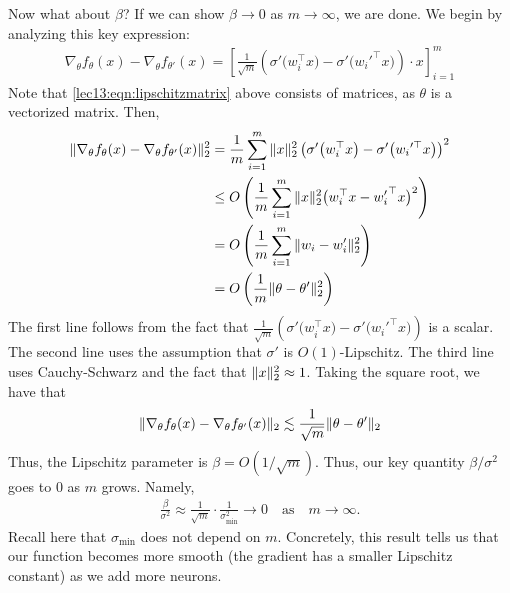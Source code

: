 \begin{enumerate}
    Now what about $\beta$? If we can show $\beta \to 0$ as $m \to \infty$, we are done. We begin by analyzing this key expression:  
    \begin{align}
        \nabla_\theta f_\theta(x) - \nabla_\theta f_{\theta'} (x) = \left[ \frac{1}{\sqrt{m}} \left( \sigma' \big( w_i^\top x \big) - \sigma' \big({w_i'}^\top x \big) \right) \cdot x \right]_{i=1}^m \label{lec13:eqn:lipschitzmatrix}
    \end{align}
    Note that \eqref{lec13:eqn:lipschitzmatrix} above consists of matrices, as $\theta$ is a vectorized matrix. Then,
    \begin{align}
        \|\nabla_\theta f_\theta(x) - \nabla_\theta f_{\theta'}(x)\|_2^2 & = \frac{1}{m}\sum_{i=1}^m \|x\|_2^2 \left( \sigma' \big(w_i^\top x \big) - \sigma' \big({w_i}'^\top x \big) \right)^2  \\ 
        & \leq O \left( \frac{1}{m}\sum_{i=1}^m \| x\|_2^2 \big( w_i^\top x - {w_i'}^\top x \big)^2 \right) \\ 
        & =  O \left( \frac{1}{m}\sum_{i=1}^m \| w_i - w_i'\|_2^2 \right) \\ 
        & = O \left(\frac{1}{m} \| \theta - \theta' \|_2^2 \right)
    \end{align} 
    The first line follows from the fact that $\frac{1}{\sqrt{m}} \left( \sigma' \big( w_i^\top x \big) - \sigma' \big({w_i'}^\top x \big) \right)$ is a scalar. The second line uses the assumption that $\sigma'$ is $O(1)$-Lipschitz. The third line uses Cauchy-Schwarz and the fact that $\|x\|_2^2 \approx 1$. Taking the square root, we have that
    \begin{align} 
        \|\nabla_\theta f_\theta(x) - \nabla_\theta f_{\theta'}(x)\|_2 \lesssim \frac{1}{\sqrt{m} } \| \theta -\theta' \|_2
    \end{align} 
    Thus, the Lipschitz parameter is $\beta = O(1/\sqrt{m})$. Thus, our key quantity $\beta/\sigma^2$ goes to $0$ as $m$ grows. Namely,
    \begin{align} 
        \frac{\beta}{\sigma^2} \approx \frac{1}{\sqrt{m} }\cdot \frac{1}{\sigma_{\min}^2} \to 0 \quad \text{as} \quad m\to\infty.
    \end{align} 
    Recall here that $\sigma_{\min}$ does not depend on $m$. Concretely, this result tells us that our function becomes more smooth (the gradient has a smaller Lipschitz constant) as we add more neurons. 
\end{enumerate}

